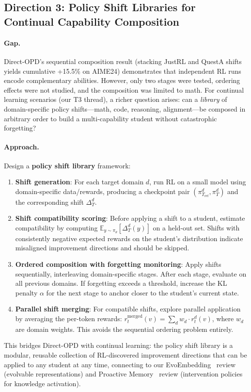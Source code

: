 \documentclass[11pt,a4paper]{article}
\begin{document}
\subsection{Direction 3: Policy Shift Libraries for Continual Capability Composition}

\paragraph{Gap.} Direct-OPD's sequential composition result (stacking JustRL and QuestA shifts yields cumulative +15.5\% on AIME24) demonstrates that independent RL runs encode complementary abilities. However, only two stages were tested, ordering effects were not studied, and the composition was limited to math. For continual learning scenarios (our T3 thread), a richer question arises: can a \emph{library} of domain-specific policy shifts---math, code, reasoning, alignment---be composed in arbitrary order to build a multi-capability student without catastrophic forgetting?

\paragraph{Approach.} Design a \textbf{policy shift library} framework:
\begin{enumerate}
\item \textbf{Shift generation}: For each target domain $d$, run RL on a small model using domain-specific data/rewards, producing a checkpoint pair $(\pi_{T_\mathrm{ref}}^d, \pi_T^d)$ and the corresponding shift $\Delta_T^d$.
\item \textbf{Shift compatibility scoring}: Before applying a shift to a student, estimate compatibility by computing $\mathbb{E}_{y \sim \pi_\theta}[\Delta_T^d(y)]$ on a held-out set. Shifts with consistently negative expected rewards on the student's distribution indicate misaligned improvement directions and should be skipped.
\item \textbf{Ordered composition with forgetting monitoring}: Apply shifts sequentially, interleaving domain-specific stages. After each stage, evaluate on all previous domains. If forgetting exceeds a threshold, increase the KL penalty $\alpha$ for the next stage to anchor closer to the student's current state.
\item \textbf{Parallel shift merging}: For compatible shifts, explore parallel application by averaging the per-token rewards: $r_t^{\mathrm{merged}}(v) = \sum_d w_d \cdot r_t^d(v)$, where $w_d$ are domain weights. This avoids the sequential ordering problem entirely.
\end{enumerate}
This bridges Direct-OPD with continual learning: the policy shift library is a modular, reusable collection of RL-discovered improvement directions that can be applied to any student at any time, connecting to our EvoEmbedding~\cite{evoembedding2026} review (evolvable representations) and Proactive Memory~\cite{proactivemem2026} review (intervention policies for knowledge activation).
\end{document}
